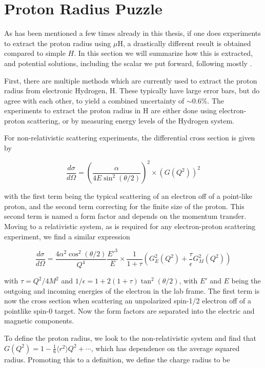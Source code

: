 \section{Proton Radius Puzzle}
As has been mentioned a few times already in this thesis, if one does experiments to extract the proton radius using $\mu\textrm{H}$, a drastically different result is obtained compared to simple $H$.
In this section we will summarize how this is extracted, and potential solutions, including the scalar we put forward, following mostly \cite{Carlson:2015jba}.

First, there are multiple methods which are currently used to extract the proton radius from electronic Hydrogen, H.
These typically have large error bars, but do agree with each other, to yield a combined uncertainty of $\sim 0.6\%$.
The experiments to extract the proton radius in H are either done using electron-proton scattering, or by measuring energy levels of the Hydrogen system.

For non-relativistic scattering experiments, the differential cross section is given by

\begin{equation}
    \frac{d\sigma}{d\Omega} = \left(\frac{\alpha}{4E\sin^2(\theta/2)}\right)^2 \times \left(G(Q^2)\right)^2
\end{equation}

\noindent with the first term being the typical scattering of an electron off of a point-like proton, and the second term correcting for the finite size of the proton.
This second term is named a form factor and depends on the momentum transfer.
Moving to a relativistic system, as is required for any electron-proton scattering experiment, we find a similar expression

\begin{equation}
    \frac{d\sigma}{d\Omega} = \frac{4 \alpha^2 \cos^2(\theta/2)}{Q^4} \frac{E'^3}{E} \times \frac{1}{1+\tau}\left(G_E^2(Q^2) + \frac{\tau}{\epsilon}G_M^2(Q^2)\right)
\end{equation}

\noindent with $\tau = Q^2/4M^2$ and $1/\epsilon = 1 + 2(1+\tau)\tan^2(\theta/2)$, with $E'$ and $E$ being the outgoing and incoming energies of the electron in the lab frame.
The first term is now the cross section when scattering an unpolarized spin-1/2 electron off of a pointlike spin-0 target.
Now the form factors are separated into the electric and magnetic components.

To define the proton radius, we look to the non-relativistic system and find that $G(Q^2) = 1 - \frac{1}{6}\langle r^2 \rangle Q^2 + \cdots$, which has dependence on the average squared radius.
Promoting this to a definition, we define the charge radius to be

